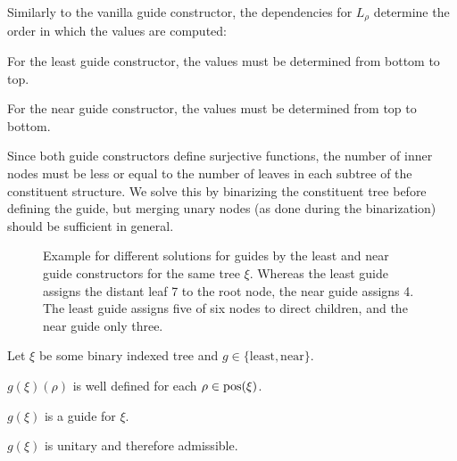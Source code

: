 \documentclass[../../document.tex]{subfiles}
\begin{document}
    Similarly to the vanilla guide constructor, the dependencies for \(L_\rho\) determine the order in which the values are computed:
    \begin{inparaenum}
        \item For the least guide constructor, the values must be determined from bottom to top.
        \item For the near guide constructor, the values must be determined from top to bottom.
    \end{inparaenum}
    Since both guide constructors define surjective functions, the number of inner nodes must be less or equal to the number of leaves in each subtree of the constituent structure.
    We solve this by binarizing the constituent tree before defining the guide, but merging unary nodes (as done during the binarization) should be sufficient in general.

    \begin{figure}
        \null\hfill
        \begin{minipage}{.35\linewidth}
            \centering
            
        \end{minipage}
        \hfill
        \begin{minipage}{.35\linewidth}
            \centering
            
        \end{minipage}
        \hfill\null
        \caption{\label{fig:guides:diff}
            Example for different solutions for guides by the least and near guide constructors for the same tree \(\xi\).
            Whereas the least guide assigns the distant leaf 7 to the root node, the near guide assigns 4.
            The least guide assigns five of six nodes to direct children, and the near guide only three.
        }
    \end{figure}

    \begin{claim}
        Let \(\xi\) be some binary indexed tree and \(g \in \{\mathrm{least}, \mathrm{near}\}\).
        \begin{compactenum}
            \item \(g(\xi)(\rho)\) is well defined for each \(\rho \in \operatorname{pos}(\xi)\).
            \item \(g(\xi)\) is a guide for \(\xi\).
            \item \(g(\xi)\) is unitary and therefore admissible.
        \end{compactenum}
    \end{claim}
\end{document}
